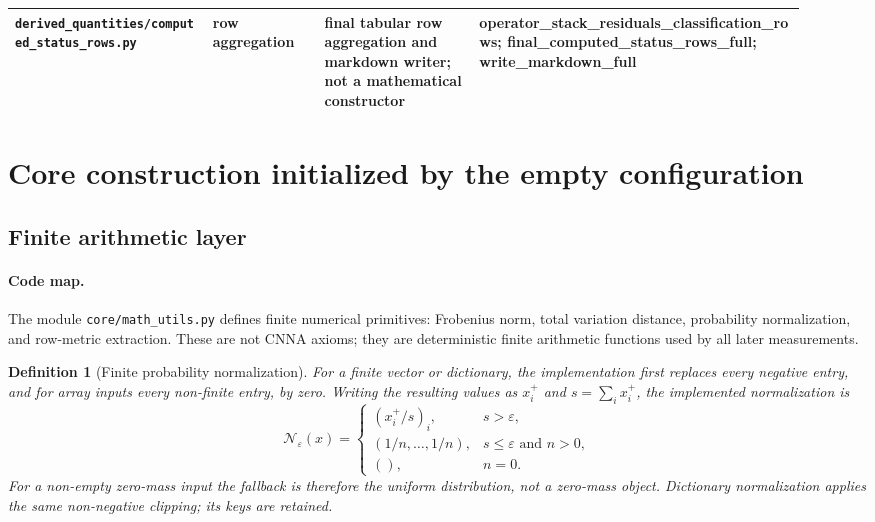 \documentclass[11pt]{article}
\newtheorem{definition}{Definition}[section]
\theoremstyle{remark}
\newcommand{\code}[1]{\texttt{#1}}
\numberwithin{equation}{section}
\begin{document}
\begin{longtable}{>{\raggedright\arraybackslash}p{0.23\linewidth}>{\raggedright\arraybackslash}p{0.13\linewidth}>{\raggedright\arraybackslash}p{0.18\linewidth}>{\raggedright\arraybackslash}p{0.38\linewidth}}
\hline
\code{derived\_\allowbreak{}quantities/computed\_\allowbreak{}status\_\allowbreak{}rows.py} & row aggregation & final tabular row aggregation and markdown writer; not a mathematical constructor & operator\_\allowbreak{}stack\_\allowbreak{}residuals\_\allowbreak{}classification\_\allowbreak{}rows; final\_\allowbreak{}computed\_\allowbreak{}status\_\allowbreak{}rows\_\allowbreak{}full; write\_\allowbreak{}markdown\_\allowbreak{}full\\
\bottomrule
\end{longtable}

\newpage
\section{Core construction initialized by the empty configuration}
\subsection{Finite arithmetic layer}
\paragraph{Code map.} The module \code{core/math\_\allowbreak{}utils.py} defines finite numerical primitives: Frobenius norm, total variation distance, probability normalization, and row-metric extraction. These are not CNNA axioms; they are deterministic finite arithmetic functions used by all later measurements.

\begin{definition}[Finite probability normalization]
For a finite vector or dictionary, the implementation first replaces every negative entry, and for array inputs every non-finite entry, by zero. Writing the resulting values as \(x_i^+\) and \(s=\sum_i x_i^+\), the implemented normalization is
\[
  \mathcal N_{\varepsilon}(x)=
  \begin{cases}
    (x_i^+/s)_i, & s>\varepsilon,\\[0.4em]
    (1/n,\ldots,1/n), & s\le\varepsilon\text{ and }n>0,\\[0.4em]
    (), & n=0.
  \end{cases}
\]
For a non-empty zero-mass input the fallback is therefore the uniform distribution, not a zero-mass object. Dictionary normalization applies the same non-negative clipping; its keys are retained.
\end{definition}
\end{document}
